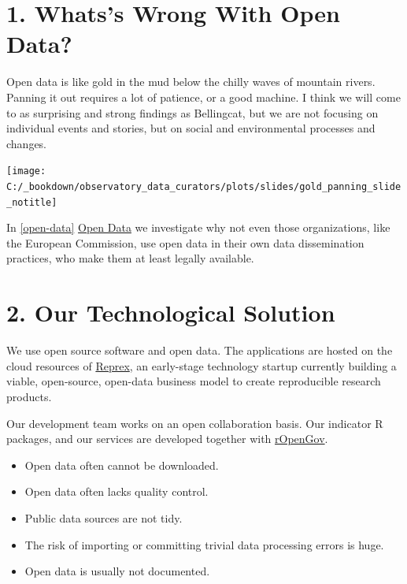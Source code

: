 \documentclass[
  a4paper,
  openany, a4paper, oneside]{book}
\providecommand{\tightlist}{%
  \setlength{\itemsep}{0pt}\setlength{\parskip}{0pt}}
\begin{document}
\hypertarget{whatss-wrong-with-open-data}{%
\section*{1. Whats's Wrong With Open Data?}\label{whatss-wrong-with-open-data}}

Open data is like gold in the mud below the chilly waves of mountain rivers. Panning it out requires a lot of patience, or a good machine. I think we will come to as surprising and strong findings as Bellingcat, but we are not focusing on individual events and stories, but on social and environmental processes and changes.

\begin{center}\texttt{[image: C:/\_bookdown/observatory\_data\_curators/plots/slides/gold\_panning\_slide\_notitle]} \end{center}

In \ref{open-data} \protect\hyperlink{open-data}{Open Data} we investigate why not even those organizations, like the European Commission, use open data in their own data dissemination practices, who make them at least legally available.

\hypertarget{tech-solution}{%
\section*{2. Our Technological Solution}\label{tech-solution}}

We use open source software and open data. The applications are hosted on the cloud resources of \protect\hyperlink{reprex}{Reprex}, an early-stage technology startup currently building a viable, open-source, open-data business model to create reproducible research products.

Our development team works on an open collaboration basis. Our indicator R packages, and our services are developed together with \href{https://music.dataobservatory.eu/author/ropengov/}{rOpenGov}.

\begin{itemize}
\tightlist
\item
  Open data often cannot be downloaded.
\item
  Open data often lacks quality control.
\item
  Public data sources are not tidy.
\item
  The risk of importing or committing trivial data processing errors is huge.
\item
  Open data is usually not documented.
\end{itemize}
\end{document}
